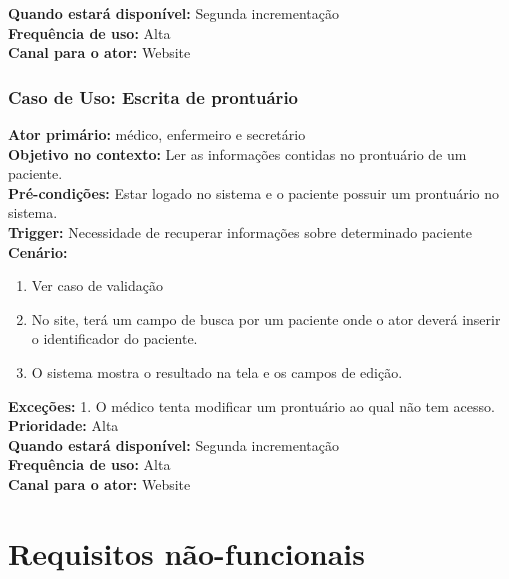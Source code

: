\documentclass[11pt,a4paper]{report}
\begin{document}
\textbf{Quando estará disponível:} Segunda incrementação\\

\textbf{Frequência de uso:} Alta\\

\textbf{Canal para o ator:} Website\\


\subsection{Caso de Uso: Escrita de prontuário}

\textbf{Ator primário:} médico, enfermeiro e secretário\\

\textbf{Objetivo no contexto:} Ler as informações contidas no prontuário de um paciente.\\

\textbf{Pré-condições:} Estar logado no sistema e o paciente possuir um prontuário no sistema.\\

\textbf{Trigger:} Necessidade de recuperar informações sobre determinado paciente\\

\textbf{Cenário:}
\begin{enumerate}
\item Ver caso de validação
\item No site, terá um campo de busca por um paciente onde o ator deverá inserir o identificador do paciente.
\item O sistema mostra o resultado na tela e os campos de edição.
\end{enumerate}


\textbf{Exceções:}
1. O médico tenta modificar um prontuário ao qual não tem acesso.\\

\textbf{Prioridade:} Alta\\

\textbf{Quando estará disponível:} Segunda incrementação\\

\textbf{Frequência de uso:} Alta\\

\textbf{Canal para o ator:} Website\\



\chapter*{Requisitos não-funcionais}
\end{document}
